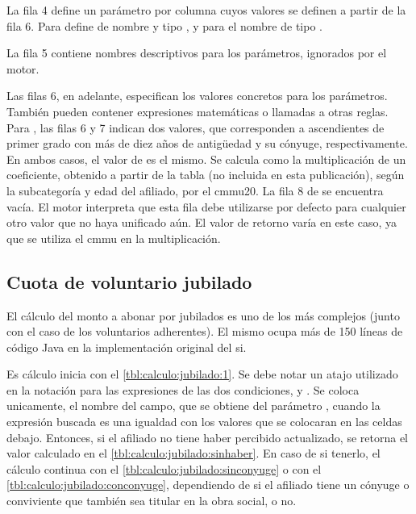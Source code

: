 


La fila 4 define un parámetro por columna cuyos valores se definen a partir de la fila 6.
Para  define de nombre  y tipo , y para  el nombre  de tipo .

La fila 5 contiene nombres descriptivos para los parámetros, ignorados por el motor.

Las filas 6, en adelante, especifican los valores concretos para los parámetros.
También pueden contener expresiones matemáticas o llamadas a otras reglas.
%
Para , las filas 6 y 7 indican dos valores, que corresponden a ascendientes de primer grado con más de diez años de antigüedad y su cónyuge, respectivamente.
En ambos casos, el valor de  es el mismo.
Se calcula como la multiplicación de un coeficiente, obtenido a partir de la tabla  (no incluida en esta publicación), según la subcategoría y edad del afiliado, por el \acrshort{cmmu20}.
%
La fila 8 de  se encuentra vacía.
El motor interpreta que esta fila debe utilizarse por defecto para cualquier otro valor que no haya unificado aún.
El valor de retorno varía en este caso, ya que se utiliza el \acrshort{cmmu} en la multiplicación.

\subsection{Cuota de voluntario jubilado}

El cálculo del monto a abonar por jubilados es uno de los más complejos (junto con el caso de los voluntarios adherentes).
El mismo ocupa más de 150 líneas de código Java en la implementación original del \acrshort{si}.

Es cálculo inicia con el \cref{tbl:calculo:jubilado:1}.
Se debe notar un atajo utilizado en la notación para las expresiones de las dos condiciones,  y .
Se coloca unicamente, el nombre del campo, que se obtiene del parámetro , cuando la expresión buscada es una igualdad con los valores que se colocaran en las celdas debajo.
Entonces, si el afiliado no tiene haber percibido actualizado, se retorna el valor calculado en el \cref{tbl:calculo:jubilado:sinhaber}. 
En caso de si tenerlo, 
el cálculo continua con el \cref{tbl:calculo:jubilado:sinconyuge} o con el \cref{tbl:calculo:jubilado:conconyuge}, dependiendo de si el afiliado tiene un cónyuge o conviviente que también sea titular en la obra social, o no.

